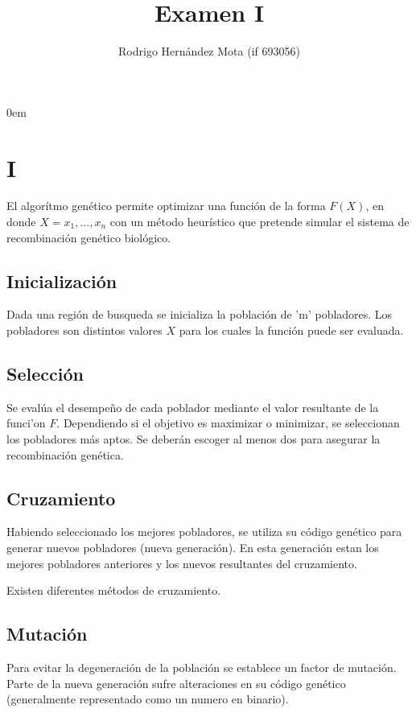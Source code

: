 \documentclass[11p]{report}
\begin{document}
\parindent 0em

\hspace{0.7cm}

\title{\textbf{Examen I}}
\author{Rodrigo Hern\'andez Mota (if 693056)}

\maketitle

\section{I}
El algor\'itmo gen\'etico permite optimizar una funci\'on de la forma $F(X)$, en donde $X = {x_1,...,x_n}$ con un m\'etodo heur\'istico que pretende simular el sistema de recombinaci\'on gen\'etico biol\'ogico. 
\subsection{Inicializaci\'on}
Dada una regi\'on de busqueda se inicializa la poblaci\'on de 'm' pobladores. Los pobladores son distintos valores $X$ para los cuales la funci\'on puede ser evaluada.
\subsection{Selecci\'on}
Se eval\'ua el desempeño de cada poblador mediante el valor resultante de la funci'on $F$. Dependiendo si el objetivo es maximizar o minimizar, se seleccionan los pobladores m\'as aptos. Se deber\'an escoger al menos dos para asegurar la recombinaci\'on gen\'etica. 
\subsection{Cruzamiento}
Habiendo seleccionado los mejores pobladores, se utiliza su c\'odigo gen\'etico para generar nuevos pobladores (nueva generaci\'on). En esta generaci\'on estan los mejores pobladores anteriores y los nuevos resultantes del cruzamiento.

Existen diferentes m\'etodos de cruzamiento.   
\subsection{Mutaci\'on}
Para evitar la degeneraci\'on de la poblaci\'on se establece un factor de mutaci\'on. Parte de la nueva generaci\'on sufre alteraciones en su c\'odigo gen\'etico (generalmente representado como un numero en binario). 
\end{document}
